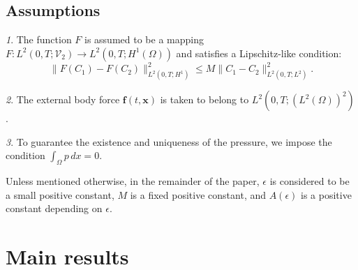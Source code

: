 \documentclass[final,3p,times]{elsarticle}
\theoremstyle{plain}
\theoremstyle{remark}
\newtheorem{assump}{}
\theoremstyle{plain}
\theoremstyle{remark}
\begin{document}
\subsection{Assumptions}\label{subsec:assumptions}
\begin{assump} \label{assump:A1}
The function \( F \) is assumed to be a mapping \( F: L^2(0,T;\mathscr V_2) \to L^2(0,T;H^1(\Omega)) \) and satisfies a Lipschitz-like condition:
\begin{equation}
    \|F(C_1) - F(C_2)\|^2_{L^2(0,T;H^1)} \le M \|C_1 - C_2\|^2_{L^2(0,T;L^2)}.
\end{equation}
\end{assump}

\begin{assump} \label{assump:A2}
The external body force $\mathbf f\left(t,\mathbf x\right)$ is taken to belong to $L^2\left(0,T;\left(L^2\left(\Omega\right)\right)^2\right)$.
\end{assump}

\begin{assump} \label{assump:A3}
To guarantee the existence and uniqueness of the pressure, we impose the condition $\int_\Omega p\, dx = 0$.
\end{assump}
\noindent

Unless mentioned otherwise, in the remainder of the paper, $\epsilon$ is considered to be a small positive constant, $M$ is a fixed positive constant, and $A\left(\epsilon\right)$ is a positive constant depending on $\epsilon$. 


\section{Main results \label{sec: main_result}}
\end{document}
